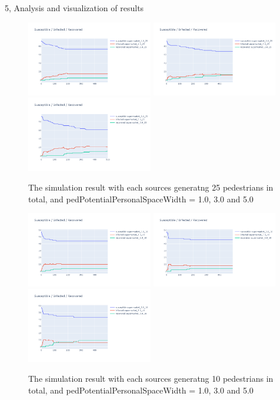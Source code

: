 \documentclass[10pt,a4paper]{article}
\begin{document}
\begin{task}{5, Analysis and visualization of results}
\begin{figure}[H]
    \includegraphics[width=5.5cm]{images/supermarket_1.0_25.png}
    \includegraphics[width=5.5cm]{images/supermarket_3.0_25.png}
    \includegraphics[width=5.5cm]{images/supermarket_5.0_25.png}
    \centering
    \caption{The simulation result with each sources generatng 25 pedestrians in total, and pedPotentialPersonalSpaceWidth = 1.0, 3.0 and 5.0}
    \label{supermarket25}
\end{figure}

\begin{figure}[H]
    \includegraphics[width=5.5cm]{images/supermarket_1.0_10.png}
    \includegraphics[width=5.5cm]{images/supermarket_3.0_10.png}
    \includegraphics[width=5.5cm]{images/supermarket_5.0_10.png}
    \centering
    \caption{The simulation result with each sources generatng 10 pedestrians in total, and pedPotentialPersonalSpaceWidth = 1.0, 3.0 and 5.0}
    \label{supermarket10}
\end{figure}


\end{task}
\end{document}
